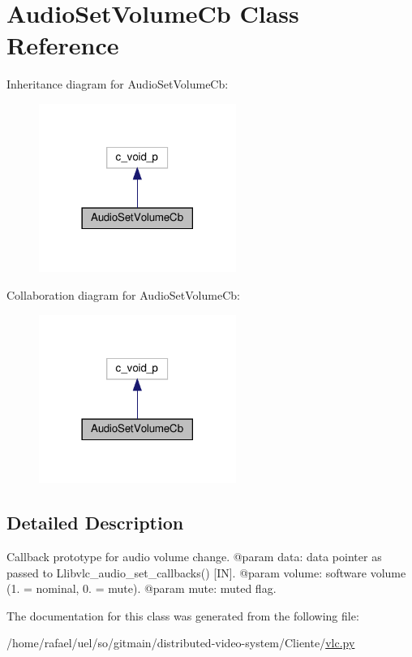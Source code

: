 \hypertarget{classvlc_1_1_audio_set_volume_cb}{}\section{Audio\+Set\+Volume\+Cb Class Reference}
\label{classvlc_1_1_audio_set_volume_cb}


Inheritance diagram for Audio\+Set\+Volume\+Cb\+:
\nopagebreak
\begin{figure}[H]
\begin{center}
\leavevmode
\includegraphics[width=182pt]{classvlc_1_1_audio_set_volume_cb__inherit__graph}
\end{center}
\end{figure}


Collaboration diagram for Audio\+Set\+Volume\+Cb\+:
\nopagebreak
\begin{figure}[H]
\begin{center}
\leavevmode
\includegraphics[width=182pt]{classvlc_1_1_audio_set_volume_cb__coll__graph}
\end{center}
\end{figure}


\subsection{Detailed Description}
\begin{DoxyVerb}Callback prototype for audio volume change.
@param data: data pointer as passed to L{libvlc_audio_set_callbacks}() [IN].
@param volume: software volume (1. = nominal, 0. = mute).
@param mute: muted flag.
\end{DoxyVerb}
 

The documentation for this class was generated from the following file\+:\begin{DoxyCompactItemize}
\item 
/home/rafael/uel/so/gitmain/distributed-\/video-\/system/\+Cliente/\hyperlink{vlc_8py}{vlc.\+py}\end{DoxyCompactItemize}
